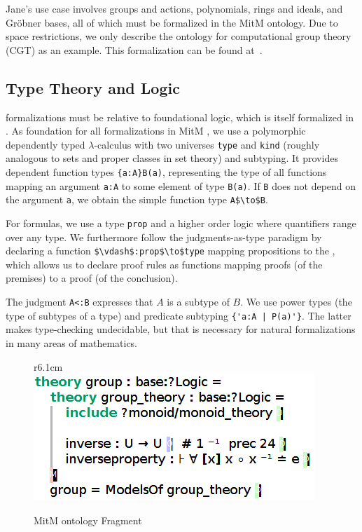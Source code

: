 Jane's use case involves groups and actions, polynomials, rings and ideals, and Gröbner bases, all of which must be formalized in the MitM ontology.
Due to space restrictions, we only describe the ontology for computational group theory (CGT) as an example.
This formalization can be found at~\cite{mitm:groups:on}.

\subsection{Type Theory and Logic}

\OMMT formalizations must be relative to foundational logic, which is itself formalized in \OMMT.
As foundation for all formalizations in MitM \cite{mitm:foundation:on}, we use a polymorphic dependently typed $\lambda$-calculus with two universes \lstinline|type| and \lstinline|kind| (roughly analogous to sets and proper classes in set theory) and subtyping.
It provides dependent function types \lstinline|{a:A}B(a)|, representing the type of all functions mapping an argument \lstinline|a:A| to some element of type \lstinline|B(a)|. If \lstinline|B| does not depend on the argument \lstinline|a|, we obtain the simple function type \lstinline[mathescape]|A$\to$B|.

For formulas, we use a type \lstinline|prop| and a higher order logic where quantifiers range over any type.
We furthermore follow the judgments-as-type paradigm by declaring a function \lstinline[mathescape]|$\vdash$:prop$\to$type| mapping propositions to the , which allows us to declare proof rules as functions mapping proofs (of the premises) to a proof (of the conclusion).

The judgment \lstinline|A<:B| expresses that $A$ is a subtype of $B$.
We use power types (the type of subtypes of a type) and predicate subtyping \lstinline?{'a:A | P(a)'}?.
The latter makes type-checking undecidable, but that is necessary for natural formalizations in many areas of mathematics.

\begin{figure}r{6.1cm}\vspace*{-2.5em}
  \includegraphics[width=.5\textwidth]{mitm1}\vspace*{-1em}
  \caption{MitM ontology Fragment}\label{fig:mitm1}\vspace*{-1em}
\end{figure}

